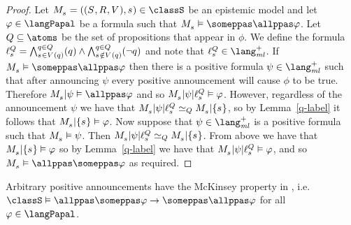 \begin{proof}
    Let $\kPModelAndTuple{\kStateS} \in \classS$ be an epistemic model and 
    let $\phi \in \langPapal$ be a formula such that $\kPModel{\kStateS} \entails \someppas \allppas \phi$.
    Let $\atomsQ \subseteq \atoms$ be the set of propositions that appear in $\phi$.
    We define the formula $\ell^{\atomsQ}_{\kStateS} = \bigwedge^{\atomQ \in \atomsQ}_{\kStateS \in \kValuation(\atomQ)} (\atomQ) \land \bigwedge^{\atomQ \in \atomsQ}_{\kStateS \notin \kValuation(\atomQ)} (\neg \atomQ)$ and note that $\ell^{\atomsQ}_{\kStateS} \in \langMlPlus$.
    If $\kPModel{\kStateS} \entails \someppas \allppas \phi$ then there is a positive formula $\psi \in \langMlPlus$ such that after announcing $\psi$ every positive announcement will cause $\phi$ to be true.
    Therefore $\restrict{\kPModel{\kStateS}}{\psi} \entails \allppas \phi$ and so $\restrict{\restrict{\kPModel{\kStateS}}{\psi}}{\ell^{\atomsQ}_{\kStateS}} \entails \phi$.
    However, regardless of the announcement $\psi$ we have that $\restrict{\restrict{\kPModel{\kStateS}}{\psi}}{\ell^{\atomsQ}_{\kStateS}} \bisimilar[\atomsQ] \restrict{\kPModel{\kStateS}}{\{\kStateS\}}$, so by Lemma~\ref{q-label} it follows that $\restrict{\kPModel{\kStateS}}{\{\kStateS\}} \entails \phi$.
    Now suppose that $\psi \in \langMlPlus$ is a positive formula such that $\kPModel{\kStateS} \entails \psi$.
    Then $\restrict{\restrict{\kPModel{\kStateS}}{\psi}}{\ell^{\atomsQ}_{\kStateS}} \bisimilar[\atomsQ] \restrict{\kPModel{\kStateS}}{\{\kStateS\}}$.
    From above we have that $\restrict{\kPModel{\kStateS}}{\{\kStateS\}} \entails \phi$ so by Lemma~\ref{q-label} we have that $\restrict{\restrict{\kPModel{\kStateS}}{\psi}}{\ell^{\atomsQ}_{\kStateS}} \entails \phi$, and so $\kPModel{\kStateS} \entails \allppas \someppas \phi$ as required.
\end{proof}

\begin{proposition}
    Arbitrary positive announcements have the McKinsey property in \classS{}, i.e. $\classS \entails \allppas \someppas \phi \implies \someppas \allppas \phi$ for all $\phi \in \langPapal$.
\end{proposition}

